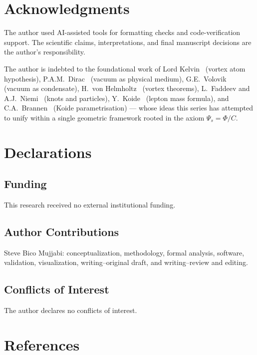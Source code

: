 \documentclass[11pt]{article}
\begin{document}
\section*{Acknowledgments}
The author used AI-assisted tools for formatting checks and code-verification
support. The scientific claims, interpretations, and final manuscript decisions
are the author's responsibility.

The author is indebted to the foundational work of
Lord Kelvin~\cite{Thomson1867} (vortex atom hypothesis),
P.A.M.~Dirac~\cite{Dirac1951} (vacuum as physical medium),
G.E.~Volovik~\cite{Volovik2003} (vacuum as condensate),
H.~von Helmholtz~\cite{Helmholtz1858} (vortex theorems),
L.~Faddeev and A.J.~Niemi~\cite{FaddeevNiemi1997} (knots and particles),
Y.~Koide~\cite{Koide1983} (lepton mass formula),
and C.A.~Brannen~\cite{Brannen2006} (Koide parametrisation)
--- whose ideas this series has attempted to unify within a single
geometric framework rooted in the axiom $\Psi_s = \Phi / C$.

\section*{Declarations}

\subsection*{Funding}
This research received no external institutional funding.

\subsection*{Author Contributions}
Steve Bico Mujjabi: conceptualization, methodology, formal analysis, software,
validation, visualization, writing--original draft, and writing--review and
editing.

\subsection*{Conflicts of Interest}
The author declares no conflicts of interest.

\section*{References}


\end{document}
